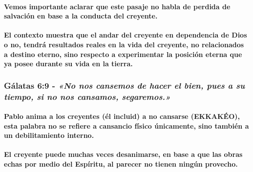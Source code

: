 \documentclass[11a pt,twoside]{article}
\newcommand{\scripture}[1]{%
  {\fontsize{12pt}{16pt}\selectfont\ScriptureFont\itshape #1}%
}
\let\oldsubsubsection\subsubsection
\renewcommand{\subsubsection}{\needspace{4\baselineskip}\oldsubsubsection}
\let\oldparagraph\paragraph
\renewcommand{\paragraph}{\needspace{3\baselineskip}\oldparagraph}
\begin{document}
\paragraph{Vemos importante aclarar que este pasaje no habla de perdida
de salvación en base a la conducta del
creyente.}\label{vemos-importante-aclarar-que-este-pasaje-no-habla-de-perdida-de-salvaciuxf3n-en-base-a-la-conducta-del-creyente.}

\paragraph{El contexto muestra que el andar del creyente en dependencia
de Dios o no, tendrá resultados reales en la vida del creyente, no
relacionados a destino eterno, sino respecto a experimentar la posición
eterna que ya posee durante su vida en la
tierra.}\label{el-contexto-muestra-que-el-andar-del-creyente-en-dependencia-de-dios-o-no-tendruxe1-resultados-reales-en-la-vida-del-creyente-no-relacionados-a-destino-eterno-sino-respecto-a-experimentar-la-posiciuxf3n-eterna-que-ya-posee-durante-su-vida-en-la-tierra.}

\subsubsection{\texorpdfstring{Gálatas 6:9 -
\scripture{«No nos cansemos de hacer el bien, pues a su tiempo, si no nos cansamos, segaremos.»}}{Gálatas 6:9 - }}\label{guxe1latas-69---no-nos-cansemos-de-hacer-el-bien-pues-a-su-tiempo-si-no-nos-cansamos-segaremos.}

\paragraph{Pablo anima a los creyentes (él incluid) a no cansarse
(EKKAKÉO), esta palabra no se refiere a cansancio físico únicamente,
sino también a un debilitamiento
interno.}\label{pablo-anima-a-los-creyentes-uxe9l-incluid-a-no-cansarse-ekkakuxe9o-esta-palabra-no-se-refiere-a-cansancio-fuxedsico-uxfanicamente-sino-tambiuxe9n-a-un-debilitamiento-interno.}

\paragraph{El creyente puede muchas veces desanimarse, en base a que las
obras echas por medio del Espíritu, al parecer no tienen ningún
provecho.}\label{el-creyente-puede-muchas-veces-desanimarse-en-base-a-que-las-obras-echas-por-medio-del-espuxedritu-al-parecer-no-tienen-ninguxfan-provecho.}
\end{document}
